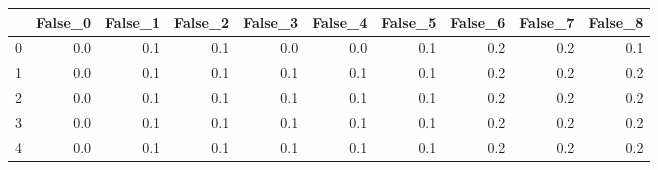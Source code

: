 \begin{tabular}{lrrrrrrrrr}
\toprule
{} &  False\_0 &  False\_1 &  False\_2 &  False\_3 &  False\_4 &  False\_5 &  False\_6 &  False\_7 &  False\_8 \\ \hline
\midrule
0 &      0.0 &      0.1 &      0.1 &      0.0 &      0.0 &      0.1 &      0.2 &      0.2 &      0.1 \\ \hline
1 &      0.0 &      0.1 &      0.1 &      0.1 &      0.1 &      0.1 &      0.2 &      0.2 &      0.2 \\ \hline
2 &      0.0 &      0.1 &      0.1 &      0.1 &      0.1 &      0.1 &      0.2 &      0.2 &      0.2 \\ \hline
3 &      0.0 &      0.1 &      0.1 &      0.1 &      0.1 &      0.1 &      0.2 &      0.2 &      0.2 \\ \hline
4 &      0.0 &      0.1 &      0.1 &      0.1 &      0.1 &      0.1 &      0.2 &      0.2 &      0.2 \\ \hline
\bottomrule
\end{tabular}
